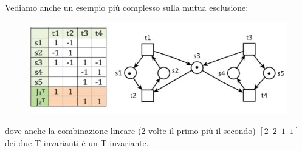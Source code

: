 \documentclass[a4paper,12pt, oneside]{book}
\begin{document}
\begin{esempio}
  Vediamo anche un esempio più complesso sulla mutua esclusione:
  \begin{figure}[H]
    \centering
    \includegraphics[scale = 0.6]{img/ti4.jpg}
  \end{figure}
  dove anche la combinazione lineare (2 volte il primo più il secondo)
  $[2\,\,\,2\,\,\,1\,\,\,1]$ dei due T-invarianti è un T-invariante.
\end{esempio}
\end{document}

